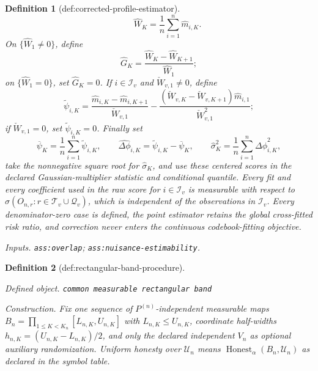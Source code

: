 \documentclass{article}
\newtheorem{definition}{Definition}
\begin{document}
\begin{definition}[def:corrected-profile-estimator]
\[ \qquad
 \widehat W_K=\frac1n\sum_{i=1}^n\widehat m_{i,K}.
\]
On \(\{\widehat W_1\neq0\}\), define
\[
 \widehat G_K=\frac{\widehat W_K-\widehat W_{K+1}}{\widehat W_1};
\]
on \(\{\widehat W_1=0\}\), set \(\widehat G_K=0\).  If \(i\in\mathcal I_v\) and \(\check W_{v,1}\neq0\), define
\[
 \widetilde\psi_{i,K}=
 \frac{\widehat m_{i,K}-\widehat m_{i,K+1}}{\check W_{v,1}}
 -\frac{(\check W_{v,K}-\check W_{v,K+1})\widehat m_{i,1}}{\check W_{v,1}^2};
\]
if \(\check W_{v,1}=0\), set \(\widetilde\psi_{i,K}=0\).  Finally set
\[
 \overline\psi_K=\frac1n\sum_{i=1}^n\widetilde\psi_{i,K},\qquad
 \widehat{\Delta\phi}_{i,K}=\widetilde\psi_{i,K}-\overline\psi_K,\qquad
 \widehat\sigma_K^2=\frac1n\sum_{i=1}^n\widehat{\Delta\phi}_{i,K}^2,
\]
take the nonnegative square root for \(\widehat\sigma_K\), and use these centered scores in the declared Gaussian-multiplier statistic and conditional quantile.  Every fit and every coefficient used in the raw score for \(i\in\mathcal I_v\) is measurable with respect to \(\sigma(O_{n,r}:r\in\mathcal T_v\cup\mathcal Q_v)\), which is independent of the observations in \(\mathcal I_v\).  Every denominator-zero case is defined, the point estimator retains the global cross-fitted risk ratio, and correction never enters the continuous codebook-fitting objective.
\par\smallskip\noindent\emph{Inputs.} \texttt{ass:\allowbreak{}overlap}; \texttt{ass:\allowbreak{}nuisance-\allowbreak{}estimability}.
\end{definition}

\begin{definition}[def:rectangular-band-procedure]\label{def:rectangular-band-procedure}
\par\smallskip\noindent\emph{Defined object.} \texttt{common measurable rectangular band}
\par\smallskip\noindent\emph{Construction.} Fix one sequence of \(P^{(n)}\)-independent measurable maps \(B_n=\prod_{1\le K<K_n}[L_{n,K},U_{n,K}]\) with \(L_{n,K}\le U_{n,K}\), coordinate half-widths \(h_{n,K}=(U_{n,K}-L_{n,K})/2\), and only the declared independent \(V_n\) as optional auxiliary randomization. Uniform honesty over \(\mathcal U_n\) means \(\operatorname{Honest}_{\alpha}(B_n,\mathcal U_n)\) as declared in the symbol table.
\end{definition}
\end{document}
